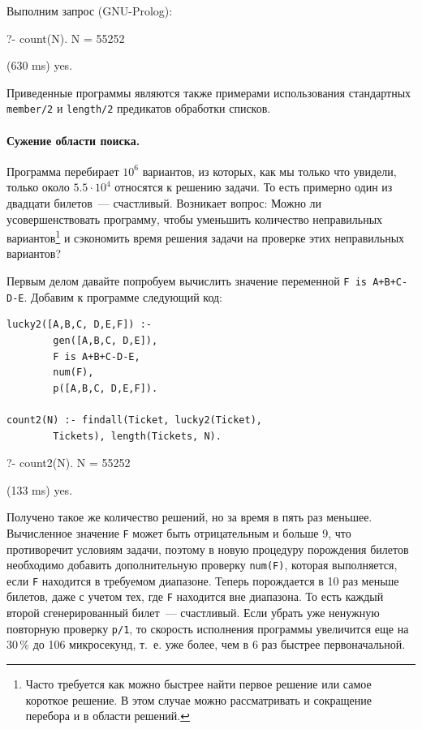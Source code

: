 \documentclass[a4paper,14pt, openany, twoside, draft]{extbook} %
\begin{document}
Выполним запрос (GNU-Prolog):

\begin{proexp}
?- count(N).
N = 55252

(630 ms) yes.
\end{proexp}

Приведенные программы являются также примерами использования стандартных \texttt{member/2} и \texttt{length/2} предикатов обработки списков.

\paragraph{Сужение области поиска.} Программа перебирает $10^6$ вариантов, из которых, как мы только что увидели, только около $5.5\cdot 10^4$ относятся к решению задачи. То есть примерно один из двадцати билетов~--- счастливый. Возникает вопрос: Можно ли усовершенствовать программу, чтобы уменьшить количество неправильных вариантов\footnote{Часто требуется как можно быстрее найти первое решение или самое короткое решение. В этом случае можно рассматривать и сокращение перебора и в области решений.} и сэкономить время решения задачи на проверке этих неправильных вариантов?

Первым делом давайте попробуем вычислить значение переменной \texttt{F is A+B+C-D-E}. Добавим к программе следующий код:

\begin{verbatim}
lucky2([A,B,C, D,E,F]) :-
        gen([A,B,C, D,E]),
        F is A+B+C-D-E,
        num(F),
        p([A,B,C, D,E,F]).

count2(N) :- findall(Ticket, lucky2(Ticket),
        Tickets), length(Tickets, N).
\end{verbatim}

\begin{proexp}
?- count2(N).
N = 55252

(133 ms) yes.
\end{proexp}

Получено такое же количество решений, но за время в пять раз меньшее. Вычисленное значение \texttt{F} может быть отрицательным и больше 9, что противоречит условиям задачи, поэтому в новую процедуру порождения билетов необходимо добавить дополнительную проверку \texttt{num(F)}, которая выполняется, если \texttt{F} находится в требуемом диапазоне. Теперь порождается в 10 раз меньше билетов, даже с учетом тех, где \texttt{F} находится вне диапазона. То есть каждый второй сгенерированный билет~--- счастливый.  Если убрать уже ненужную повторную проверку \texttt{p/1}, то скорость исполнения программы увеличится еще на 30\,{}\% до 106 микросекунд, т.~е. уже более, чем в 6 раз быстрее первоначальной.
\end{document}
